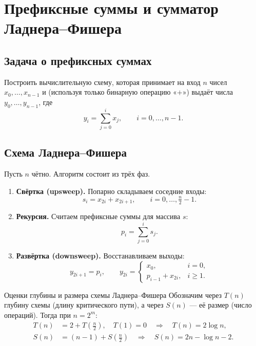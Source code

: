 
\section{Префиксные суммы и сумматор Ладнера–Фишера}

\subsection{Задача о префиксных суммах}

Построить вычислительную схему, которая принимает на вход $n$ чисел $x_0, \dots, x_{n-1}$ и (используя только бинарную операцию «$+$») выдаёт числа $y_0, \dots, y_{n-1}$, где
\[
y_i = \sum_{j=0}^{i} x_j, \qquad i = 0, \dots, n-1.
\]

\subsection{Схема Ладнера–Фишера}

Пусть $n$ чётно. Алгоритм состоит из трёх фаз.

\begin{enumerate}
	\item \textbf{Свёртка (upsweep).} Попарно складываем соседние входы:
	\[
	s_i = x_{2i} + x_{2i+1}, \qquad i = 0, \dots, \tfrac{n}{2} - 1.
	\]
	
	\item \textbf{Рекурсия.} Считаем префиксные суммы для массива $s$:
	\[
	p_i = \sum_{j=0}^{i} s_j.
	\]
	
	\item \textbf{Развёртка (downsweep).} Восстанавливаем выходы:
	\[
	y_{2i+1} = p_i, \qquad
	y_{2i} =
	\begin{cases}
		x_0, & i = 0, \\
		p_{i-1} + x_{2i}, & i \geq 1.
	\end{cases}
	\]
\end{enumerate}

\begin{Statement}{Оценки глубины и размера схемы Ладнера–Фишера}{}
	Обозначим через $T(n)$ глубину схемы (длину критического пути), а через $S(n)$ — её размер (число операций). Тогда при $n = 2^m$:
	\begin{align*}
		T(n) &= 2 + T\!\left(\tfrac{n}{2}\right), \quad T(1) = 0
		\quad \Longrightarrow \quad T(n) = 2\log n, \\
		S(n) &= (n-1) + S\!\left(\tfrac{n}{2}\right)
		\quad \Longrightarrow \quad S(n) = 2n - \log n - 2.
	\end{align*}
\end{Statement}

